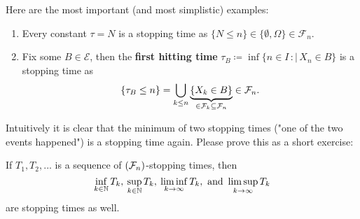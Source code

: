 Here are the most important (and most simplistic) examples:
\begin{example}\label{ex_ch2_3}
\begin{lbeispiel}
	\begin{enumerate}[label=(\roman*)]
			\item 
			Every constant $\tau = N$ is a stopping time as $\{N \leq n\}\in \{\emptyset, \Omega\}\in \mathcal F_n$.

		\item
			Fix some $B\in \mathcal E$, then the \textbf{first hitting time} $\tau_B \coloneqq \inf\lbrace n \in I\,:|\, X_n \in B \rbrace$  is a stopping time as
			\begin{align*}
				\lbrace \tau_B \leq n \rbrace = \bigcup\limits_{k\leq n}\underbrace{\lbrace X_k \in B \rbrace}_{\in \mathcal F_k\subseteq \mathcal F_n} \in \mathcal{F}_n.
			\end{align*}
	\end{enumerate}
\end{lbeispiel}

\end{example}
Intuitively it is clear that the minimum of two stopping times ("{}one of the two events happened"{}) is a stopping time again. Please prove this as a short exercise:
\begin{luebung}
	If $T_1, T_2,...$ is a sequence of $(\mathcal{F}_n)$-stopping times, then 
	\[ \inf_{k\in\mathbb{N}} T_k , \:\sup_{k\in\mathbb{N}} T_k , \:\liminf_{k\to\infty} T_k, \text{ and }\limsup_{k\to\infty} T_k \]
	are stopping times as well.
\end{luebung}

